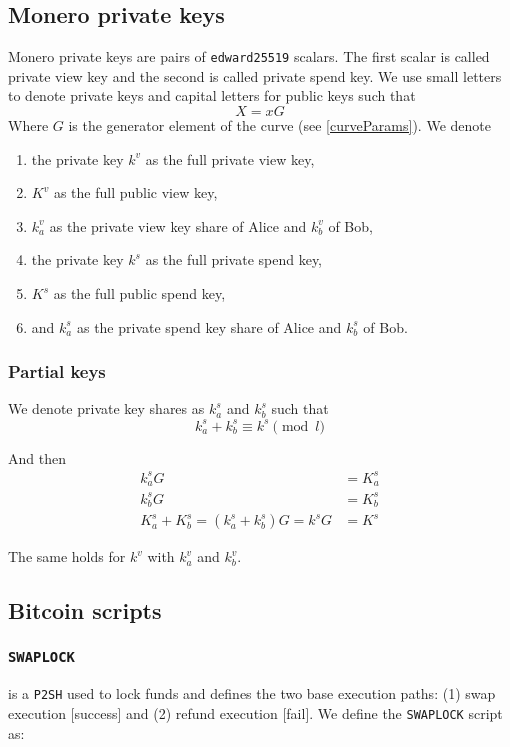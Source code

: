 \documentclass{llncs}
\begin{document}
\subsection{Monero private keys}
Monero private keys are pairs of \texttt{edward25519} scalars. The first scalar is called private view key and the second is called private spend key. We use small letters to denote private keys and capital letters for public keys such that
$$X = xG$$
Where $G$ is the generator element of the curve (see \ref{curveParams}). We denote
\begin{enumerate}[label=(\roman*)]
    \item the private key $k^v$ as the full private view key,
    \item $K^v$ as the full public view key,
    \item $k^v_a$ as the private view key share of Alice and $k^v_b$ of Bob,
    \item the private key $k^s$ as the full private spend key,
    \item $K^s$ as the full public spend key,
    \item and $k^s_a$ as the private spend key share of Alice and $k^s_b$ of Bob.
\end{enumerate}

\subsubsection{Partial keys}
We denote private key shares as $k^s_a$ and $k^s_b$ such that
$$k^s_a + k^s_b \equiv k^s \pmod l$$

And then
\begin{equation}
\begin{split}
    k^s_aG &= K^s_a \\
    k^s_bG &= K^s_b \\
    K^s_a + K^s_b = (k^s_a + k^s_b)G = k^sG &= K^s
\end{split}
\end{equation}

The same holds for $k^v$ with $k^v_a$ and $k^v_b$.

\subsection{Bitcoin scripts}

\subsubsection{\texttt{SWAPLOCK}}
is a \texttt{P2SH} used to lock funds and defines the two base execution paths: (1) swap execution [success] and (2) refund execution [fail]. We define the \texttt{SWAPLOCK} script as:
\end{document}
